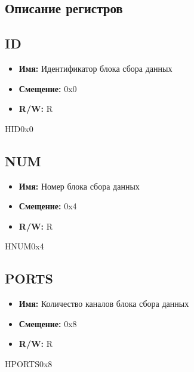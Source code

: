 \subsection{Описание регистров}

\subsection{ID}
\label{sec:ID}
\begin{itemize}
  \setlength{\itemsep}{0pt}
  \setlength{\parskip}{0pt}
  \setlength{\parsep}{0pt}
  \item \textbf{Имя:} Идентификатор блока сбора данных
  \item \textbf{Смещение:} 0x0
  \item \textbf{R/W:} R
\end{itemize}
\begin{register}{H}{ID}{0x0}
%
\regnewline%
\end{register}

\subsection{NUM}
\label{sec:NUM}
\begin{itemize}
  \setlength{\itemsep}{0pt}
  \setlength{\parskip}{0pt}
  \setlength{\parsep}{0pt}
  \item \textbf{Имя:} Номер блока сбора данных
  \item \textbf{Смещение:} 0x4
  \item \textbf{R/W:} R
\end{itemize}
\begin{register}{H}{NUM}{0x4}
%
\regnewline%
\end{register}

\subsection{PORTS}
\label{sec:PORTS}
\begin{itemize}
  \setlength{\itemsep}{0pt}
  \setlength{\parskip}{0pt}
  \setlength{\parsep}{0pt}
  \item \textbf{Имя:} Количество каналов блока сбора данных
  \item \textbf{Смещение:} 0x8
  \item \textbf{R/W:} R
\end{itemize}
\begin{register}{H}{PORTS}{0x8}
%
\regnewline%
\end{register}


